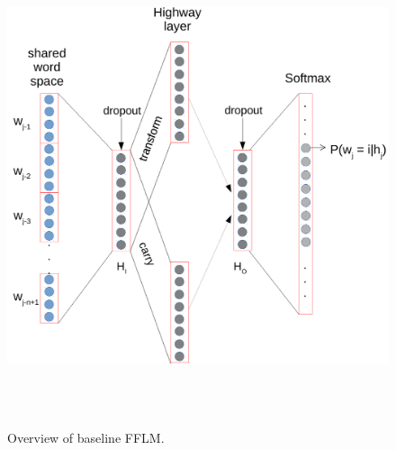 
~ \begin{figure}[!t]
~ \centering
~ \includegraphics[width=\columnwidth/2]{figures/baseline.pdf}
~ \caption{Overview of baseline FFLM.}  
~ \label{fig:baseline}
~ \end{figure}
%

